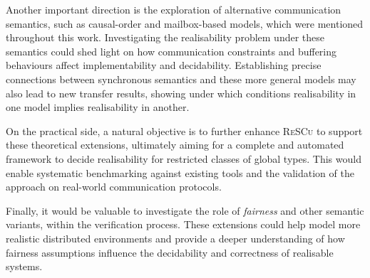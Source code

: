 Another important direction is the exploration of alternative
communication semantics, such as causal-order and mailbox-based models,
which were mentioned throughout this work. Investigating the
realisability problem under these semantics could shed light on how
communication constraints and buffering behaviours affect implementability
and decidability. Establishing precise connections between synchronous
semantics and these more general models may also lead to new transfer
results, showing under which conditions realisability in one model
implies realisability in another.  

On the practical side, a natural objective is to further enhance
\textsc{ReSCu} to support these theoretical extensions, ultimately
aiming for a complete and automated framework to decide realisability
for restricted classes of global types. This would enable systematic
benchmarking against existing tools and the validation of the approach
on real-world communication protocols.  

Finally, it would be valuable to investigate the role of \emph{fairness}
and other semantic variants, within the verification process. 
These extensions could help
model more realistic distributed environments and provide a deeper
understanding of how fairness assumptions influence the decidability and
correctness of realisable systems.
